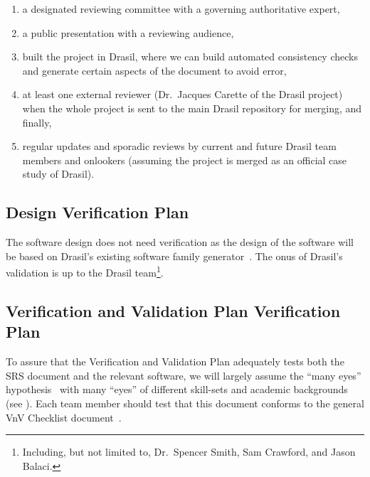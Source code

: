 \documentclass[12pt, titlepage]{article}
\begin{document}
\begin{enumerate}

    \item a designated reviewing committee with a governing authoritative
          expert,

    \item a public presentation with a reviewing audience,

    \item built the project in Drasil, where we can build automated consistency
          checks and generate certain aspects of the document to avoid error,

    \item at least one external reviewer (Dr.\ Jacques Carette of the Drasil
          project) when the whole \progname{} project is sent to the main Drasil
          repository for merging, and finally,

    \item regular updates and sporadic reviews by current and future Drasil team
          members and onlookers (assuming the project is merged as an official
          case study of Drasil).

\end{enumerate}

\subsection{Design Verification Plan}

The software design does not need verification as the design of the software
will be based on Drasil's existing software family
generator~\cite{Drasil2023}. The onus of
Drasil's validation is up to the Drasil team\footnote{Including, but not limited
    to, Dr.\ Spencer Smith, Sam Crawford, and Jason Balaci.}.

\subsection{Verification and Validation Plan Verification Plan}

To assure that the Verification and Validation Plan adequately tests both the
SRS document and the relevant software, we will largely assume the ``many eyes''
hypothesis~\cite{Caraco1980avian} with many ``eyes'' of different skill-sets and
academic backgrounds (see ). Each team member should
test that this document conforms to the general VnV Checklist
document~\cite{SmithCapTemplate}.
\end{document}
